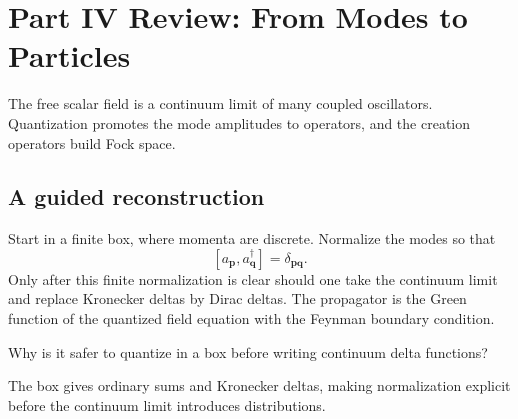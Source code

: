 
\chapter{Part IV Review: From Modes to Particles}

The free scalar field is a continuum limit of many coupled oscillators.  Quantization promotes the mode amplitudes to operators, and the creation operators build Fock space.

\section{A guided reconstruction}













Start in a finite box, where momenta are discrete.  Normalize the modes so that
\[
  [a_{\bm p},a_{\bm q}^\dagger]=\delta_{\bm p\bm q}.
\]
Only after this finite normalization is clear should one take the continuum limit and replace Kronecker deltas by Dirac deltas.  The propagator is the Green function of the quantized field equation with the Feynman boundary condition.

\begin{exercise}
Why is it safer to quantize in a box before writing continuum delta functions?
\begin{answer}
The box gives ordinary sums and Kronecker deltas, making normalization explicit before the continuum limit introduces distributions.
\end{answer}
\end{exercise}
